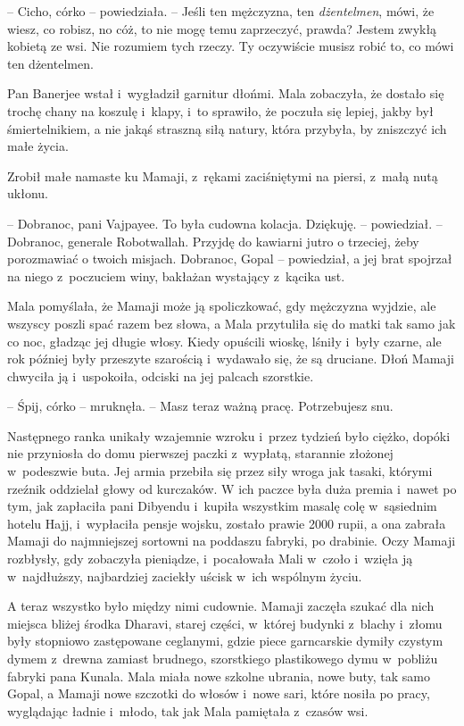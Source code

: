 \documentclass[oneside,polish,11pt,rmheadings]{mwbk}
\begin{document}
-- Cicho, córko -- powiedziała. -- Jeśli ten mężczyzna, ten \textit{dżentelmen}, mówi, że wiesz, co robisz, no cóż, to nie mogę temu zaprzeczyć, prawda? Jestem zwykłą kobietą ze wsi. Nie rozumiem tych rzeczy. Ty oczywiście musisz robić to, co mówi ten dżentelmen. 


Pan Banerjee wstał i~wygładził garnitur dłońmi. Mala zobaczyła, że dostało się trochę chany na koszulę i~klapy, i~to sprawiło, że poczuła się lepiej, jakby był śmiertelnikiem, a nie jakąś straszną siłą natury, która przybyła, by zniszczyć ich małe życia. 


Zrobił małe namaste ku Mamaji, z~rękami zaciśniętymi na piersi, z~małą nutą ukłonu. 

-- Dobranoc, pani Vajpayee. To była cudowna kolacja. Dziękuję. -- powiedział. -- Dobranoc, generale Robotwallah. Przyjdę do kawiarni jutro o trzeciej, żeby porozmawiać o twoich misjach. Dobranoc, Gopal -- powiedział, a jej brat spojrzał na niego z~poczuciem winy, bakłażan wystający z~kącika ust. 


Mala pomyślała, że Mamaji może ją spoliczkować, gdy mężczyzna wyjdzie, ale wszyscy poszli spać razem bez słowa, a Mala przytuliła się do matki tak samo jak co noc, gładząc jej długie włosy. Kiedy opuścili wioskę, lśniły i~były czarne, ale rok później były przeszyte szarością i~wydawało się, że są druciane. Dłoń Mamaji chwyciła ją i~uspokoiła, odciski na jej palcach szorstkie. 


-- Śpij, córko -- mruknęła. -- Masz teraz ważną pracę. Potrzebujesz snu. 


Następnego ranka unikały wzajemnie wzroku i~przez tydzień było ciężko, dopóki nie przyniosła do domu pierwszej paczki z~wypłatą, starannie złożonej w~podeszwie buta. Jej armia przebiła się przez siły wroga jak tasaki, którymi rzeźnik oddzielał głowy od kurczaków. W ich paczce była duża premia i~nawet po tym, jak zapłaciła pani Dibyendu i~kupiła wszystkim masalę colę w~sąsiednim hotelu Hajj, i~wypłaciła pensje wojsku, zostało prawie 2000 rupii, a ona zabrała Mamaji do najmniejszej sortowni na poddaszu fabryki, po drabinie. Oczy Mamaji rozbłysły, gdy zobaczyła pieniądze, i~pocałowała Mali w~czoło i~wzięła ją w~najdłuższy, najbardziej zaciekły uścisk w~ich wspólnym życiu. 


A teraz wszystko było między nimi cudownie. Mamaji zaczęła szukać dla nich miejsca bliżej środka Dharavi, starej części, w~której budynki z~blachy i~złomu były stopniowo zastępowane ceglanymi, gdzie piece garncarskie dymiły czystym dymem z~drewna zamiast brudnego, szorstkiego plastikowego dymu w~pobliżu fabryki pana Kunala. Mala miała nowe szkolne ubrania, nowe buty, tak samo Gopal, a Mamaji nowe szczotki do włosów i~nowe sari, które nosiła po pracy, wyglądając ładnie i~młodo, tak jak Mala pamiętała z~czasów wsi. 
\end{document}
